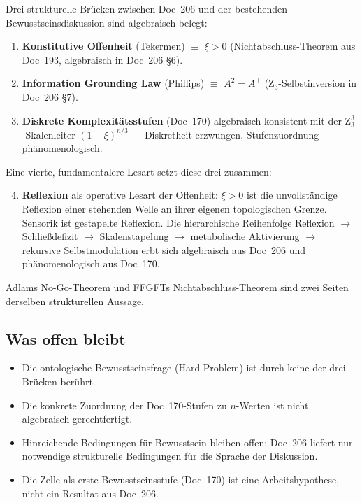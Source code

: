 \begin{conclusionBox}
Drei strukturelle Brücken zwischen Doc~206 und der bestehenden Bewusstseinsdiskussion sind algebraisch belegt:

\begin{enumerate}
\item \textbf{Konstitutive Offenheit} (Tekermen) $\equiv$ $\xi > 0$ (Nichtabschluss-Theorem aus Doc~193, algebraisch in Doc~206 \S6).
\item \textbf{Information Grounding Law} (Phillips) $\equiv$ $A^2 = A^\top$ (Z$_3$-Selbstinversion in Doc~206 \S7).
\item \textbf{Diskrete Komplexitätsstufen} (Doc~170) algebraisch konsistent mit der Z$_3^3$-Skalenleiter $(1-\xi)^{n/3}$ — Diskretheit erzwungen, Stufenzuordnung phänomenologisch.
\end{enumerate}

Eine vierte, fundamentalere Lesart setzt diese drei zusammen:

\begin{enumerate}
\setcounter{enumi}{3}
\item \textbf{Reflexion} als operative Lesart der Offenheit: $\xi > 0$ ist die unvollständige Reflexion einer stehenden Welle an ihrer eigenen topologischen Grenze. Sensorik ist gestapelte Reflexion. Die hierarchische Reihenfolge Reflexion $\to$ Schließdefizit $\to$ Skalenstapelung $\to$ metabolische Aktivierung $\to$ rekursive Selbstmodulation erbt sich algebraisch aus Doc~206 und phänomenologisch aus Doc~170.
\end{enumerate}

Adlams No-Go-Theorem und FFGFTs Nichtabschluss-Theorem sind zwei Seiten derselben strukturellen Aussage.
\end{conclusionBox}

\subsection{Was offen bleibt}

\begin{itemize}
\item Die ontologische Bewusstseinsfrage (\glqq Hard Problem\grqq{}) ist durch keine der drei Brücken berührt.
\item Die konkrete Zuordnung der Doc~170-Stufen zu $n$-Werten ist nicht algebraisch gerechtfertigt.
\item Hinreichende Bedingungen für Bewusstsein bleiben offen; Doc~206 liefert nur notwendige strukturelle Bedingungen für die Sprache der Diskussion.
\item Die Zelle als \glqq erste Bewusstseinsstufe\grqq{} (Doc~170) ist eine Arbeitshypothese, nicht ein Resultat aus Doc~206.
\end{itemize}


